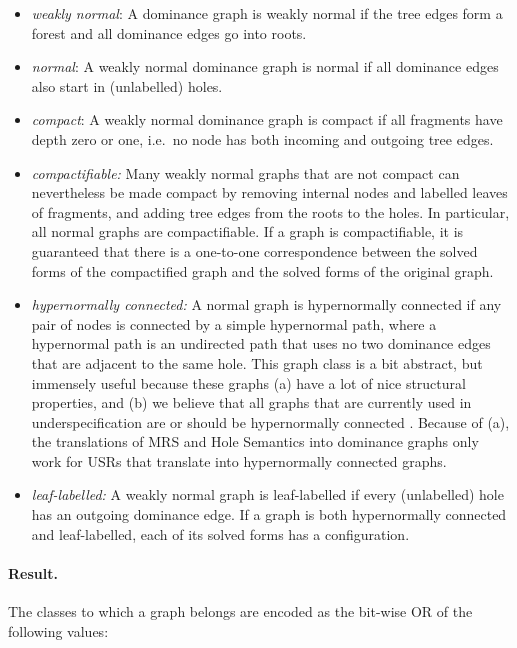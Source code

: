\begin{itemize}
\item \emph{weakly normal}: A dominance graph is weakly normal
\cite{bodirsky-weakly-normal-constraints} if the tree edges form a
forest and all dominance edges go into roots.
\item \emph{normal}: A weakly normal dominance graph is normal
\cite{Althaus-J.Algo.} if all dominance edges also start in
(unlabelled) holes.
\item \emph{compact}: A weakly normal dominance graph is compact if
all fragments have depth zero or one, i.e.\ no node has both incoming
and outgoing tree edges.
\item \emph{compactifiable:} Many weakly normal graphs that are not
compact can nevertheless be made compact by removing internal nodes
and labelled leaves of fragments, and adding tree edges from the roots
to the holes. In particular, all normal graphs are compactifiable. If
a graph is compactifiable, it is guaranteed that there is a one-to-one
correspondence between the solved forms of the compactified graph and
the solved forms of the original graph.
\item \emph{hypernormally connected:} A normal graph is hypernormally
connected \cite{KolNieTha03,Koller04} if any pair of nodes is
connected by a simple hypernormal path, where a hypernormal path is an
undirected path that uses no two dominance edges that are adjacent to
the same hole. This graph class is a bit abstract, but immensely
useful because these graphs (a) have a lot of nice structural
properties, and (b) we believe that all graphs that are currently used
in underspecification are or should be hypernormally connected
\cite{FucKolNieTha04}. Because of (a), the translations of MRS and
Hole Semantics into dominance graphs only work for USRs that translate
into hypernormally connected graphs.
\item \emph{leaf-labelled:} A weakly normal graph is leaf-labelled
\cite{KolNieTha03} if every (unlabelled) hole has an outgoing
dominance edge. If a graph is both hypernormally connected and
leaf-labelled, each of its solved forms has a configuration.
\end{itemize}


\paragraph{Result.}
The classes to which a graph belongs are encoded as the bit-wise OR of
the following values:

